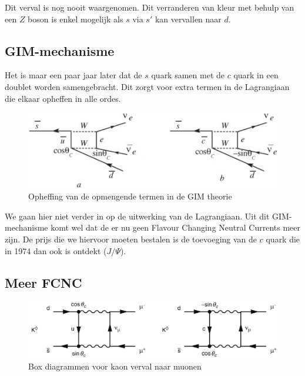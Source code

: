\documentclass[../main.tex]{subfiles}
\begin{document}
Dit verval is nog nooit waargenomen. Dit verranderen van kleur met behulp van een $Z$ boson is enkel mogelijk als $s$ via $s'$ kan vervallen naar $d$.

\subsection{GIM-mechanisme}%
\label{sub:gim_mechanisme}

Het is maar een paar jaar later dat de $s$ quark samen met de $c$ quark in een doublet worden samengebracht. Dit zorgt voor extra termen in de Lagrangiaan die elkaar opheffen in alle ordes.

\begin{figure}[h]
    \centering
    \includegraphics[width=0.6\linewidth]{meson_mixing_and_oscillations/gim_opheffing.png}
    \caption{Opheffing van de opmengende termen in de GIM theorie}%
    \label{fig:meson_mixing_and_oscillations/gim_opheffing}
\end{figure}

We gaan hier niet verder in op de uitwerking van de Lagrangiaan. Uit dit GIM-mechanisme komt wel dat de er nu geen Flavour Changing Neutral Currents meer zijn. De prijs die we hiervoor moeten bestalen is de toevoeging van de $c$ quark die in 1974 dan ook is ontdekt ($J/\Psi$).

\subsection{Meer FCNC}%
\label{sub:meer_fcnc}

\begin{figure}[h]
    \centering
    \includegraphics[width=0.8\linewidth]{meson_mixing_and_oscillations/fcnc.png}
    \caption{Box diagrammen voor kaon verval naar muonen}%
    \label{fig:meson_mixing_and_oscillations/fcnc}
\end{figure}
\end{document}
